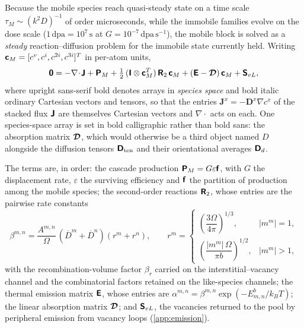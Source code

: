 Because the mobile species reach quasi-steady state on a time scale
$\tau_M\sim(k^2D)^{-1}$ of order microseconds, while the immobile families evolve
on the dose scale ($1\,\mathrm{dpa}=10^{7}\,\mathrm{s}$ at
$G=10^{-7}\,\mathrm{dpa\,s^{-1}}$), the mobile block is solved as a
\emph{steady} reaction--diffusion problem for the immobile state currently held.
Writing $\bm{\mathsf{c}}_M=[c^v,c^i,c^{2i},c^{3i}]^{T}$ in per-atom units,
\begin{equation}
  \bm{\mathsf{0}} = -\nabla\!\cdot\!\bm{\mathsf{J}}
    + \bm{\mathsf{P}}_M
    + \tfrac12\,(\bm{\mathsf{I}}\otimes\bm{\mathsf{c}}_M^{T})\,\bm{\mathsf{R}}_2\,\bm{\mathsf{c}}_M
    + (\bm{\mathsf{E}}-\bm{\mathcal{D}})\,\bm{\mathsf{c}}_M
    + \bm{\mathsf{S}}_{vL},
  \label{eq:master-c}
\end{equation}
where upright sans-serif bold denotes arrays in \emph{species space} and
bold italic ordinary Cartesian vectors and tensors, so that the entries
$\bm J^{x}=-\bm D^{x}\nabla c^{x}$ of the stacked flux $\bm{\mathsf{J}}$ are themselves
Cartesian vectors and $\nabla\cdot$ acts on each. One species-space array is
set in bold calligraphic rather than bold sans: the absorption matrix $\bm{\mathcal{D}}$,
which would otherwise be a third object named $D$ alongside the diffusion
tensors $\bm{\mathsf{D}}_{\mathrm{ten}}$ and their orientational averages
$\bm{\mathsf{D}}_d$.

The terms are, in order: the cascade production
$\bm{\mathsf{P}}_M=G\varepsilon\bm{\mathsf{f}}$, with $G$ the displacement rate, $\varepsilon$
the surviving efficiency and $\bm{\mathsf{f}}$ the partition of production among the
mobile species; the second-order reactions $\bm{\mathsf{R}}_2$, whose entries are the
pairwise rate constants
\begin{equation}
  \beta^{m,n}=\frac{A^{m,n}}{\Omega}\,(\overline D^{m}+\overline D^{n})(r^{m}+r^{n}),
  \qquad
  r^{m}=\begin{cases}
    \left(\dfrac{3\Omega}{4\pi}\right)^{1/3}, & |m^{m}|=1,\\[9pt]
    \left(\dfrac{|m^{m}|\,\Omega}{\pi b}\right)^{1/2}, & |m^{m}|>1,
  \end{cases}
  \label{eq:rates}
\end{equation}
with the recombination-volume factor $\beta_r$ carried on the
interstitial--vacancy channel and the combinatorial factors retained on the
like-species channels; the thermal emission matrix $\bm{\mathsf{E}}$, whose entries are
$\alpha^{m,n}=\beta^{m,n}\exp(-E^{b}_{m,n}/k_BT)$; the linear absorption matrix
$\bm{\mathcal{D}}$; and $\bm{\mathsf{S}}_{vL}$, the vacancies returned to the pool by
peripheral emission from vacancy loops (\cref{app:emission}).

